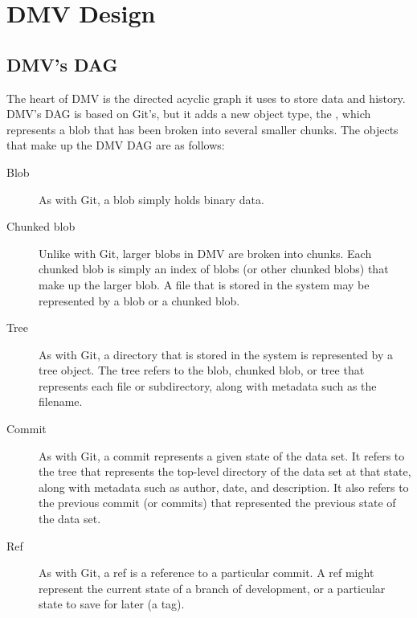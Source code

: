 \chapter{DMV Design}


\section{DMV's DAG}

The heart of DMV is the directed acyclic graph it uses to store data and
history. DMV's DAG is based on Git's, but it adds a new object type, the
, which represents a blob that has been broken into several smaller chunks. The objects that
make up the DMV DAG are as follows:

\begin{description}

    \item[Blob] As with Git, a blob simply holds binary data.

    \item[Chunked blob] Unlike with Git, larger blobs in DMV are broken into
        chunks. Each chunked blob is simply an index of blobs (or other chunked
        blobs) that make up the larger blob. A file that is stored in the system
        may be represented by a blob or a chunked blob.

    \item[Tree] As with Git, a directory that is stored in the system is
        represented by a tree object. The tree refers to the blob, chunked blob,
        or tree that represents each file or subdirectory, along with metadata
        such as the filename.

    \item[Commit] As with Git, a commit represents a given state of the data
        set. It refers to the tree that represents the top-level directory of
        the data set at that state, along with metadata such as author, date,
        and description. It also refers to the previous commit (or commits) that
        represented the previous state of the data set.

    \item[Ref] As with Git, a ref is a reference to a particular commit. A ref
        might represent the current state of a branch of development, or a
        particular state to save for later (a tag).

\end{description}

